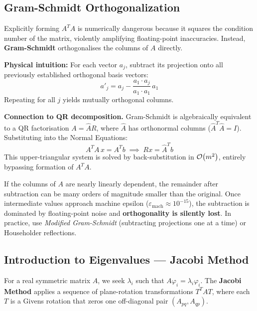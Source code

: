 \subsection{Gram-Schmidt Orthogonalization}
Explicitly forming $A^T A$ is numerically dangerous because it squares the
condition number of the matrix, violently amplifying floating-point
inaccuracies. Instead, \textbf{Gram-Schmidt} orthogonalises the columns of
$A$ directly.

\noindent\textbf{Physical intuition:} For each vector $a_j$, subtract its
projection onto all previously established orthogonal basis vectors:
\begin{equation}
a'_j = a_j - \frac{a_1 \cdot a_j}{a_1 \cdot a_1}\, a_1
\end{equation}
Repeating for all $j$ yields mutually orthogonal columns.

\textbf{Connection to QR decomposition.} Gram-Schmidt is algebraically
equivalent to a QR factorisation $A = \hat{A}R$, where $\hat{A}$ has
orthonormal columns ($\hat{A}^T\hat{A} = I$). Substituting into the Normal
Equations:
\begin{equation}
A^T A\, x = A^T b \;\implies\; Rx = \hat{A}^T b
\end{equation}
This upper-triangular system is solved by back-substitution in $\mathcal{O}\!\left(m^2\right)$,
entirely bypassing formation of $A^T A$.

\begin{tcolorbox}[colback=orange!5!white,colframe=orange!75!black,
  title=Numerical Stability Warning: Loss of Orthogonality]
If the columns of $A$ are nearly linearly dependent, the remainder after
subtraction can be many orders of magnitude smaller than the original. Once
intermediate values approach machine epsilon ($\varepsilon_{\text{mach}}
\approx 10^{-15}$), the subtraction is dominated by floating-point noise and
\textbf{orthogonality is silently lost}. In practice, use
\emph{Modified Gram-Schmidt} (subtracting projections one at a time) or
Householder reflections.
\end{tcolorbox}

\subsection{Introduction to Eigenvalues --- Jacobi Method}
For a real symmetric matrix $A$, we seek $\lambda_i$ such that
$A\varphi_i = \lambda_i\varphi_i$. The \textbf{Jacobi Method} applies a
sequence of plane-rotation transformations $T^T A T$, where each $T$ is a
Givens rotation that zeros one off-diagonal pair $(A_{pq}, A_{qp})$.

